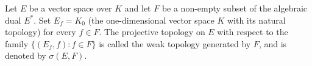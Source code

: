 Let $E$ be a vector space over $K$ and let $F$ be a non-empty subset of the algebraic dual $E^*$. Set $E_f = K_0$ (the one-dimensional vector space $K$ with its natural topology) for every $f \in F$. The projective topology on $E$ with respect to the family $\{(E_f, f): f \in F\}$ is called the weak topology generated by $F$, and is denoted by $\sigma(E, F)$.
